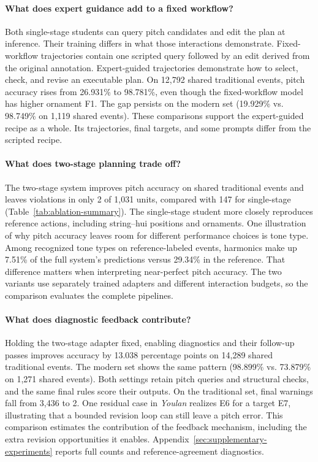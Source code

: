 \paragraph{What does expert guidance add to a fixed workflow?}
Both single-stage students can query pitch candidates and edit the plan at inference. Their training differs in what those interactions demonstrate. Fixed-workflow trajectories contain one scripted query followed by an edit derived from the original annotation. Expert-guided trajectories demonstrate how to select, check, and revise an executable plan. On 12,792 shared traditional events, pitch accuracy rises from 26.931\% to 98.781\%, even though the fixed-workflow model has higher ornament F1. The gap persists on the modern set (19.929\% vs. 98.749\% on 1,119 shared events). These comparisons support the expert-guided recipe as a whole. Its trajectories, final targets, and some prompts differ from the scripted recipe.

\paragraph{What does two-stage planning trade off?}
The two-stage system improves pitch accuracy on shared traditional events and leaves violations in only 2 of 1,031 units, compared with 147 for single-stage (Table~\ref{tab:ablation-summary}). The single-stage student more closely reproduces reference actions, including string--hui positions and ornaments. One illustration of why pitch accuracy leaves room for different performance choices is tone type. Among recognized tone types on reference-labeled events, harmonics make up 7.51\% of the full system's predictions versus 29.34\% in the reference. That difference matters when interpreting near-perfect pitch accuracy. The two variants use separately trained adapters and different interaction budgets, so the comparison evaluates the complete pipelines.

\paragraph{What does diagnostic feedback contribute?}
Holding the two-stage adapter fixed, enabling diagnostics and their follow-up passes improves accuracy by 13.038 percentage points on 14,289 shared traditional events. The modern set shows the same pattern (98.899\% vs. 73.879\% on 1,271 shared events). Both settings retain pitch queries and structural checks, and the same final rules score their outputs. On the traditional set, final warnings fall from 3,436 to 2. One residual case in \emph{Youlan} realizes E6 for a target E7, illustrating that a bounded revision loop can still leave a pitch error. This comparison estimates the contribution of the feedback mechanism, including the extra revision opportunities it enables. Appendix~\ref{sec:supplementary-experiments} reports full counts and reference-agreement diagnostics.

